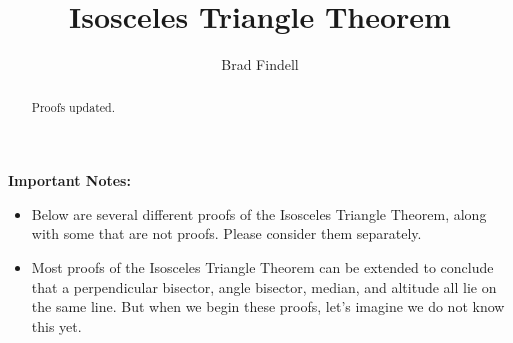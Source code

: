 \documentclass[nooutcomes]{ximera}
\title{Isosceles Triangle Theorem}
\author{Brad Findell}
\begin{document}
\begin{abstract}
Proofs updated. 
\end{abstract}
\maketitle

%
%


\textbf{Important Notes:}
\begin{itemize}
\item Below are several different proofs of the Isosceles Triangle Theorem, along with some that are not proofs.  Please consider them separately.
\item Most proofs of the Isosceles Triangle Theorem can be extended to conclude that a perpendicular bisector, angle bisector, median, and altitude all lie on the same line.  But when we begin these proofs, let's imagine we do not know this yet.
\end{itemize}
\end{document}
